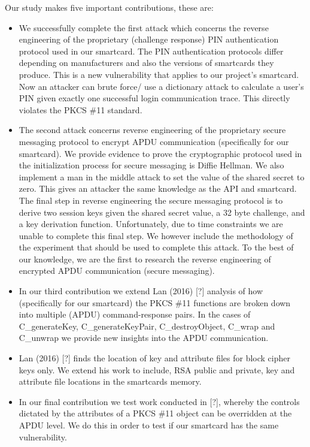 \documentclass[bsc,frontabs,twoside,singlespacing,parskip,deptreport]{infthesis}     %
\begin{document}
Our study makes five important contributions, these are:
\begin{itemize}

\item We successfully complete the first attack which concerns the reverse engineering of the proprietary (challenge response) PIN authentication protocol used in our smartcard. The PIN authentication protocols differ depending on manufacturers and also the versions of smartcards they produce. This is a new vulnerability that applies to our project's smartcard. Now an attacker can brute force/ use a dictionary attack to calculate a user's PIN given exactly one successful login communication trace. This directly violates the PKCS \#11 standard.

\item The second attack concerns reverse engineering of the proprietary secure messaging protocol to encrypt APDU communication (specifically for our smartcard). We provide evidence to prove the cryptographic protocol used in the initialization process for secure messaging is Diffie Hellman. We also implement a man in the middle attack to set the value of the shared secret to zero. This gives an attacker the same knowledge as the API and smartcard. The final step in reverse engineering the secure messaging protocol is to derive two session keys given the shared secret value, a 32 byte challenge, and a key derivation function. Unfortunately, due to time constraints we are unable to complete this final step. We however include the methodology of the experiment that should be used to complete this attack. To the best of our knowledge, we are the first to research the reverse engineering of encrypted APDU communication (secure messaging).

\item In our third contribution we extend Lan (2016) [?] analysis of how (specifically for our smartcard) the PKCS \#11 functions are broken down into multiple (APDU) command-response pairs. In the cases of C\_generateKey, C\_generateKeyPair, C\_destroyObject, C\_wrap and C\_unwrap we provide new insights into the APDU communication.


\item Lan (2016) [?] finds the location of key and attribute files for block cipher keys only. We extend his work to include, RSA public and private, key and attribute file locations in the smartcards memory.

\item In our final contribution we test work conducted in [?], whereby the controls dictated by the attributes of a PKCS \#11 object can be overridden at the APDU level. We do this in order to test if our smartcard has the same vulnerability.\\

\end{itemize}
\end{document}
